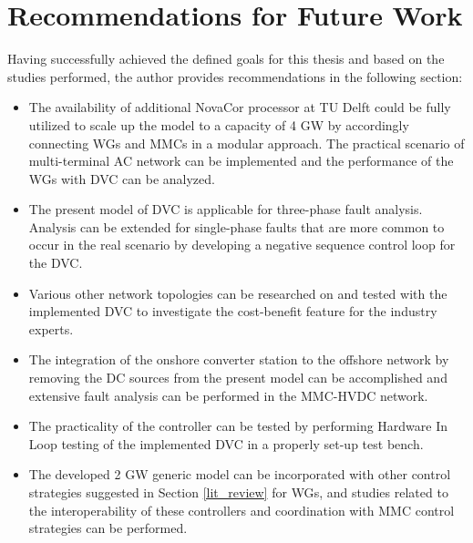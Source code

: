 \section{Recommendations for Future Work}
Having successfully achieved the defined goals for this thesis and based on the studies performed, the author provides recommendations in the following section:  
\begin{itemize}
    \item The availability of additional NovaCor processor at TU Delft could be fully utilized to scale up the model to a capacity of 4 GW by accordingly connecting \gls{WG}s and \gls{MMC}s in a modular approach. The practical scenario of multi-terminal \gls{AC} network can be implemented and the performance of the \gls{WG}s with \gls{DVC} can be analyzed.
    \item The present model of \gls{DVC} is applicable for three-phase fault analysis. Analysis can be extended for single-phase faults that are more common to occur in the real scenario by developing a negative sequence control loop for the \gls{DVC}.
    \item Various other network topologies can be researched on and tested with the implemented \gls{DVC} to investigate the cost-benefit feature for the industry experts. 
    \item The integration of the onshore converter station to the offshore network by removing the \gls{DC} sources from the present model can be accomplished and extensive fault analysis can be performed in the \gls{MMC}-\gls{HVDC} network.
    \item The practicality of the controller can be tested by performing Hardware In Loop testing of the implemented \gls{DVC} in a properly set-up test bench.
    \item The developed 2 GW generic model can be incorporated with other control strategies suggested in Section \ref{lit_review} for \gls{WG}s, and studies related to the interoperability of these controllers and coordination with \gls{MMC} control strategies can be performed.
\end{itemize}